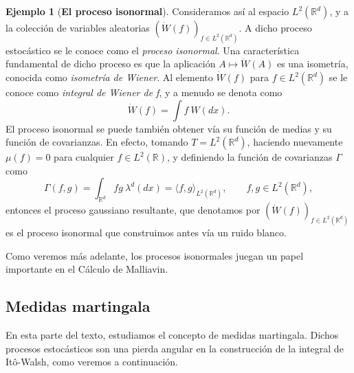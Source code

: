 \documentclass[letterpaper,twoside,12pt]{book}
\newcommand{\R}{\mathbb{R}}
\newcommand{\W}{\dot{W}}
\newcommand{\1}{\mathds{1}}
\theoremstyle{definition}
\theoremstyle{definition}
\theoremstyle{remark}
\theoremstyle{definition}
\theoremstyle{definition}
\theoremstyle{definition}
\theoremstyle{definition}
\newtheorem{ejem}{Ejemplo}
\theoremstyle{definition}
\begin{document}
\begin{ejem}[\textbf{El proceso isonormal}]
Consideramos así al espacio $L^{2}(\R^{d})$, y a la colección de variables aleatorias $(\W(f))_{f\in L^{2}(\R^{d})}$. A dicho proceso estocástico se le conoce como el \textit{proceso isonormal}. Una característica fundamental de dicho proceso es que la aplicación $A\mapsto\W(A)$ es una isometría, conocida como \textit{isometría de Wiener}. Al elemento $\W(f)$ para $f\in L^2(\R^{d})$ se le conoce como \textit{integral de Wiener de f}, y a menudo se denota como
\[
\W(f)=\int f \ W(dx).    
\] 
El proceso isonormal se puede también obtener vía su función de medias y su función de covarianzas. En efecto, tomando $T=L^{2}(\R^{d})$, haciendo nuevamente $\mu(f)=0$ para cualquier $f\in L^2(\R)$, y definiendo la función de covarianzas $\Gamma$ como
\[
\Gamma(f,g)=\int_{\R^d}fg \ \lambda^d(dx)=\langle f,g\rangle_{L^{2}(\R^{d})}, \qquad f,g\in L^2(\R^{d}),
\]
entonces el proceso gaussiano resultante, que denotamos por $(\W(f))_{f\in L^{2}(\R^{d})}$ es el proceso isonormal que construimos antes vía un ruido blanco. 
 \end{ejem}

 Como veremos más adelante, los procesos isonormales juegan un papel importante en el Cálculo de Malliavin.
\subsection{Medidas martingala}

En esta parte del texto, estudiamos el concepto de medidas martingala. Dichos procesos estocásticos son una pierda angular en la construcción de la integral de Itô-Walsh, como veremos a continuación.
\end{document}
